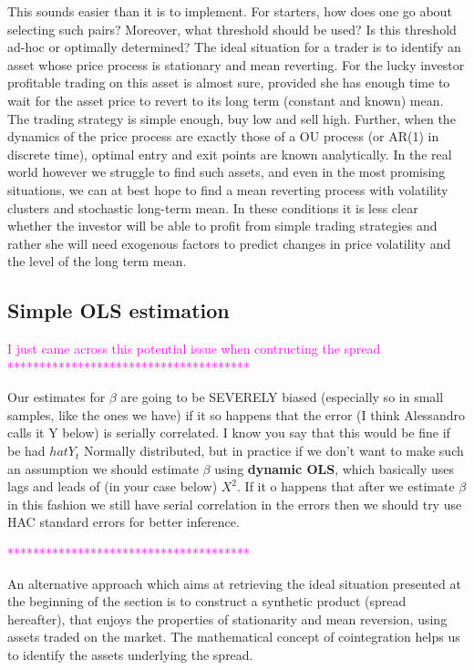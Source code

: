 \documentclass[a4paper,11pt]{article}
\theoremstyle{remark}
\theoremstyle{plain}
\begin{document}
This sounds easier than it is to implement. For starters, how does one go about selecting such pairs? Moreover, what threshold should be used? Is this threshold ad-hoc or optimally determined? The ideal situation for a trader is to identify an asset whose price process is stationary and mean reverting. For the lucky investor profitable trading on this asset is almost sure, provided she has enough time to wait for the asset price to revert to its long term (constant and known) mean. The trading strategy is simple enough, buy low and sell high. Further, when the dynamics of the price process are exactly those of a OU process (or AR(1) in discrete time), optimal entry and exit points are known analytically.
In the real world however we struggle to find such assets, and even in the most promising situations, we can at best hope to find a mean reverting process with volatility clusters and stochastic long-term mean. In these conditions it is less clear whether the investor will be able to profit from simple trading strategies and rather she will need exogenous factors to predict changes in price volatility and the level of the long term mean.

\subsection{Simple OLS estimation}
\label{sub:simple_OLS}


\textcolor{magenta}{I just came across this potential issue when contructing the spread\\ **************************************}

Our estimates for $\beta$ are going to be SEVERELY biased (especially so in small samples, like the ones we have) if it so happens that the error (I think Alessandro calls it Y below) is serially correlated. I know you say that this would be fine if be had $hat{Y}_{t}$ Normally distributed, but in practice if we don't want to make such an assumption we should estimate $\beta$ using \textbf{dynamic OLS}, which basically uses lags and leads of (in your case below) $X^2$. If it o happens that after we estimate $\beta$ in this fashion we still have serial correlation in the errors then we should try use HAC standard errors for better inference. 

\textcolor{magenta}{**************************************}

An alternative approach which aims at retrieving the ideal situation presented at the beginning of the section is to construct a synthetic product (spread hereafter), that enjoys the properties of stationarity and mean reversion, using assets traded on the market. The mathematical concept of cointegration helps us to identify the assets underlying the spread.
\end{document}
